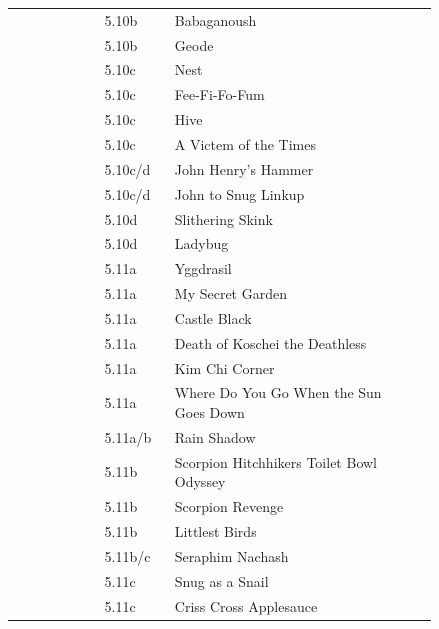 \begin{flushleft}
\begin{center}
\begin{supertabular}{p{0.18\linewidth}p{0.13\linewidth}p{0.45\linewidth}p{0.08\linewidth}}
&5.10b&Babaganoush & \pageref{rt:Babaganoush} \\
&5.10b&Geode & \pageref{rt:Geode} \\
&5.10c&Nest & \pageref{rt:Nest} \\
&5.10c&Fee-Fi-Fo-Fum & \pageref{rt:Fee-Fi-Fo-Fum} \\
&5.10c&Hive & \pageref{rt:Hive} \\
&5.10c&A Victem of the Times & \pageref{vr:A Victem of the Times} \\
&5.10c/d&John Henry's Hammer & \pageref{rt:John Henry's Hammer} \\
&5.10c/d&John to Snug Linkup & \pageref{vr:John to Snug Linkup} \\
&5.10d&Slithering Skink & \pageref{rt:Slithering Skink} \\
&5.10d&Ladybug & \pageref{rt:Ladybug} \\
&5.11a&Yggdrasil & \pageref{rt:Yggdrasil} \\
&5.11a&My Secret Garden & \pageref{rt:My Secret Garden} \\
&5.11a&Castle Black & \pageref{rt:Castle Black} \\
&5.11a&Death of Koschei the Deathless & \pageref{rt:Death of Koschei the Deathless} \\
&5.11a&Kim Chi Corner & \pageref{rt:Kim Chi Corner} \\
&5.11a&Where Do You Go When the Sun Goes Down & \pageref{rt:Where Do You Go When the Sun Goes Down} \\
&5.11a/b&Rain Shadow & \pageref{rt:Rain Shadow} \\
&5.11b&Scorpion Hitchhikers Toilet Bowl Odyssey & \pageref{rt:Scorpion Hitchhikers Toilet Bowl Odyssey} \\
&5.11b&Scorpion Revenge & \pageref{rt:Scorpion Revenge} \\
&5.11b&Littlest Birds & \pageref{rt:Littlest Birds} \\
&5.11b/c&Seraphim Nachash & \pageref{rt:Seraphim Nachash} \\
&5.11c&Snug as a Snail & \pageref{rt:Snug as a Snail} \\
&5.11c&Criss Cross Applesauce & \pageref{rt:Criss Cross Applesauce} \\

\end{supertabular}
\end{center}
\end{flushleft}
